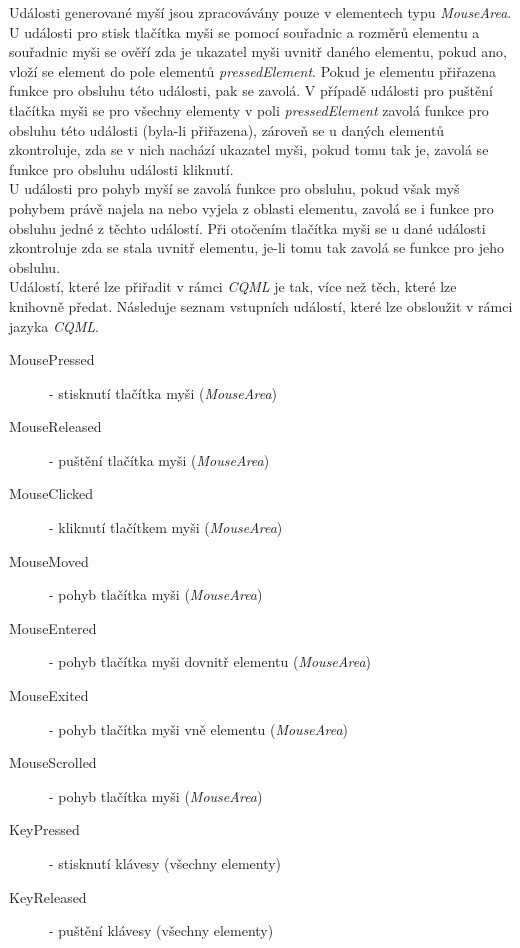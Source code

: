 \documentclass[11pt,twoside,a4paper]{book}
\begin{document}
Události generované myší jsou zpracovávány pouze v elementech typu \textit{MouseArea}. U události pro stisk tlačítka myši se pomocí souřadnic a rozměrů elementu a souřadnic myši se ověří zda je ukazatel myši uvnitř daného elementu, pokud ano, vloží se element do pole elementů \textit{pressedElement}. Pokud je elementu přiřazena funkce pro obsluhu této události, pak se zavolá. V případě události pro puštění tlačítka myši se pro všechny elementy v poli \textit{pressedElement} zavolá funkce pro obsluhu této události (byla-li přiřazena), zároveň se u daných elementů zkontroluje, zda se v nich nachází ukazatel myši, pokud tomu tak je, zavolá se funkce pro obsluhu události kliknutí.\\
U události pro pohyb myší se zavolá funkce pro obsluhu, pokud však myš pohybem právě najela na nebo vyjela z oblasti elementu, zavolá se i funkce pro obsluhu jedné z těchto událostí. Při otočením tlačítka myši se u dané události zkontroluje zda se stala uvnitř elementu, je-li tomu tak zavolá se funkce pro jeho obsluhu.\\
Událostí, které lze přiřadit v rámci \textit{CQML} je tak, více než těch, které lze knihovně předat. Následuje seznam vstupních událostí, které lze obsloužit v rámci jazyka \textit{CQML}.
\begin{description}
\item[MousePressed] - stisknutí tlačítka myši (\textit{MouseArea})
\item[MouseReleased] - puštění tlačítka myši (\textit{MouseArea})
\item[MouseClicked] - kliknutí tlačítkem myši (\textit{MouseArea})
\item[MouseMoved] - pohyb tlačítka myši (\textit{MouseArea})
\item[MouseEntered] - pohyb tlačítka myši dovnitř elementu (\textit{MouseArea})
\item[MouseExited] - pohyb tlačítka myši vně elementu (\textit{MouseArea})
\item[MouseScrolled] - pohyb tlačítka myši (\textit{MouseArea})
\item[KeyPressed] - stisknutí klávesy (všechny elementy)
\item[KeyReleased] - puštění klávesy (všechny elementy)
\end{description}
\end{document}
